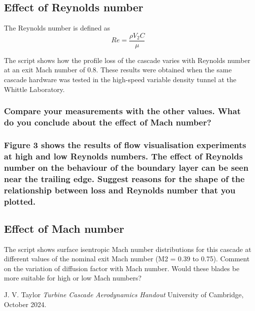 \documentclass{article}
\begin{document}
\subsection{Effect of Reynolds number}

The Reynolds number is defined as
\begin{equation}
    Re = \frac{\rho V_2 C}{\mu}
\end{equation}

The script shows how the profile loss of the cascade varies with Reynolds number at an exit
Mach number of 0.8. These results were obtained when the same cascade hardware was tested
in the high-speed variable density tunnel at the Whittle Laboratory.

\subsubsection{Compare your measurements with the other values. What do you conclude about the
effect of Mach number?}


\subsubsection{Figure 3 shows the results of flow visualisation experiments at high and low Reynolds
numbers. The effect of Reynolds number on the behaviour of the boundary layer can be seen
near the trailing edge. Suggest reasons for the shape of the relationship between loss and
Reynolds number that you plotted.}



\subsection{Effect of Mach number}
The script shows surface isentropic Mach number distributions for this cascade at different
values of the nominal exit Mach number (M2 = 0.39 to 0.75). Comment on the variation of
diffusion factor with Mach number. Would these blades be more suitable for high or low Mach
numbers?


\begin{thebibliography}{9}


  J. V. Taylor
  \emph{Turbine Cascade Aerodynamics Handout}
  University of Cambridge,
  October 2024.

\end{thebibliography}
\end{document}
